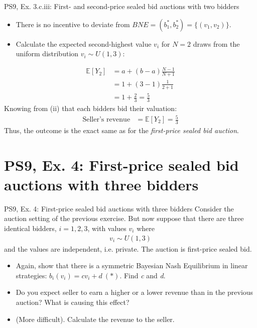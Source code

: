 \begin{frame}{PS9, Ex. 3.c.iii: First- and second-price sealed bid auctions with two bidders}
\begin{multicols}{2}
      \vspace{-20pt}
      \begin{itemize}
        \item[(ii)] There is no incentive to deviate from $BNE=(b_1^*,b_2^*)=\{(v_1,v_2)\}$.
        \item[(iii)] Calculate the expected second-highest value $v_i$ for $N=2$ draws from the uniform distribution $v_i\sim U(1,3)$:
      \end{itemize}
      \vspace{-18pt}
      \begin{align*}
        \mathbb{E}[Y_2]&=a+(b-a)\frac{N-1}{N+1}\\
                       &=1+(3-1)\frac{1}{2+1}\\
                       &=1+\frac{2}{3}=\frac{5}{3}
      \end{align*}
      Knowing from (ii) that each bidders bid their valuation:
      \vspace{-8pt}
      \begin{align*}
        \text{Seller's revenue}&=\mathbb{E}[Y_2]=\frac{5}{3}
      \end{align*}
      Thus, the outcome is the exact same as for the \textit{first-price sealed bid auction}.
      \vfill\null
    \end{multicols}
\end{frame}



\section{PS9, Ex. 4: First-price sealed bid auctions with three bidders}

\begin{frame}{PS9, Ex. 4: First-price sealed bid auctions with three bidders}
    Consider the auction setting of the previous exercise. But now suppose that there are three identical bidders, $i = 1, 2, 3$, with values $v_i$ where
    \begin{align*}
      v_i\sim U(1, 3)
    \end{align*}
    and the values are independent, i.e. private. The auction is first-price sealed bid.
    \begin{itemize}
      \item[(a)] Again, show that there is a symmetric Bayesian Nash Equilibrium in linear strategies: $b_i(v_i) = cv_i + d\ (*)$. Find \textit{c} and \textit{d}.
      \item[(b)] Do you expect seller to earn a higher or a lower revenue than in the previous auction? What is causing this effect?
      \item[(c)] (More difficult). Calculate the revenue to the seller.
    \end{itemize}
    \vfill\null
\end{frame}


